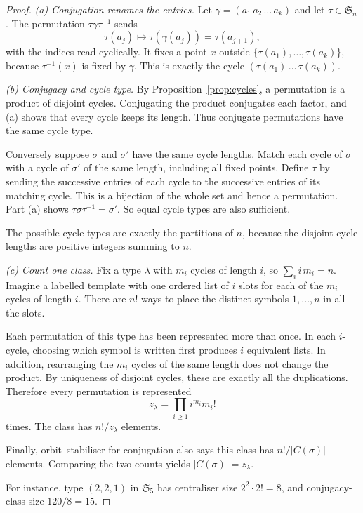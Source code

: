\begin{proof}
\emph{(a) Conjugation renames the entries.}
Let $\gamma=(a_1\,a_2\,\ldots\,a_k)$ and
let $\tau\in\mathfrak S_n$. The permutation
$\tau\gamma\tau^{-1}$ sends
\[
\tau(a_j)\mapsto\tau(\gamma(a_j))
=\tau(a_{j+1}),
\]
with the indices read cyclically.
It fixes a point $x$ outside
$\{\tau(a_1),\ldots,\tau(a_k)\}$, because
$\tau^{-1}(x)$ is fixed by $\gamma$.
This is exactly the cycle
$(\tau(a_1)\,\ldots\,\tau(a_k))$.

\emph{(b) Conjugacy and cycle type.}
By Proposition~\ref{prop:cycles}, a permutation
is a product of disjoint cycles. Conjugating the
product conjugates each factor, and (a) shows that
every cycle keeps its length. Thus conjugate
permutations have the same cycle type.

Conversely suppose $\sigma$ and $\sigma'$
have the same cycle lengths. Match each cycle
of $\sigma$ with a cycle of $\sigma'$ of the
same length, including all fixed points.
Define $\tau$ by sending the successive entries
of each cycle to the successive entries of
its matching cycle. This is a bijection of the
whole set and hence a permutation. Part (a)
shows $\tau\sigma\tau^{-1}=\sigma'$.
So equal cycle types are also sufficient.

The possible cycle types are exactly the
partitions of $n$, because the disjoint cycle
lengths are positive integers summing to $n$.

\emph{(c) Count one class.}
Fix a type $\lambda$ with $m_i$ cycles of length
$i$, so $\sum_i i\,m_i=n$. Imagine a labelled
template with one ordered list of $i$ slots
for each of the $m_i$ cycles of length $i$.
There are $n!$ ways to place the distinct
symbols $1,\ldots,n$ in all the slots.

Each permutation of this type has been
represented more than once. In each
$i$-cycle, choosing which symbol is written
first produces $i$ equivalent lists.
In addition, rearranging the $m_i$ cycles
of the same length does not change the product.
By uniqueness of disjoint cycles, these are
exactly all the duplications. Therefore every
permutation is represented
\[
z_\lambda=\prod_{i\ge1}i^{m_i}m_i!
\]
times. The class has $n!/z_\lambda$ elements.

Finally, orbit--stabiliser for conjugation
also says this class has $n!/|C(\sigma)|$
elements. Comparing the two counts yields
$\boxed{|C(\sigma)|=z_\lambda}$.

For instance, type $(2,2,1)$ in $\mathfrak S_5$
has centraliser size $2^2\cdot2!=8$,
and conjugacy-class size $120/8=15$.
\end{proof}

